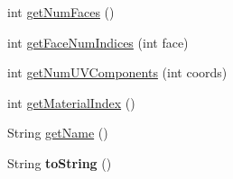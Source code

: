 \begin{DoxyCompactItemize}
\item 
int \hyperlink{classjassimp_1_1_ai_mesh_a0fdbef791e24c6edefcb08f89acad885}{get\+Num\+Faces} ()
\item 
int \hyperlink{classjassimp_1_1_ai_mesh_a34ea13053c044aa612ad94cdf74b6395}{get\+Face\+Num\+Indices} (int face)
\item 
int \hyperlink{classjassimp_1_1_ai_mesh_afb524dc36282d86c2d02382ff3583598}{get\+Num\+U\+V\+Components} (int coords)
\item 
int \hyperlink{classjassimp_1_1_ai_mesh_a5ac59c6e98f8057b62ce6d6032be02a7}{get\+Material\+Index} ()
\item 
String \hyperlink{classjassimp_1_1_ai_mesh_ae03a07f41270efa9ffb39982b8c75c05}{get\+Name} ()
\item 
\hypertarget{classjassimp_1_1_ai_mesh_a945c8642aeef864aca8e6c73f4c5c9db}{String {\bfseries to\+String} ()}\label{classjassimp_1_1_ai_mesh_a945c8642aeef864aca8e6c73f4c5c9db}


\end{DoxyCompactItemize}
